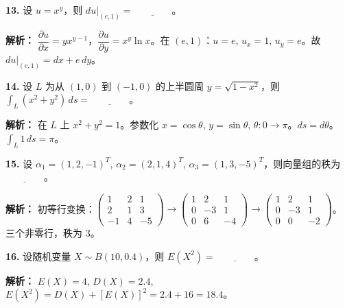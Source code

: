 \vspace{8pt}

\textbf{13.} 设 $u = x^y$，则 $du|_{(e,1)} = \underline{\qquad\qquad}$。

\ifshowsolutions\par\noindent\textbf{解析：} $\dfrac{\partial u}{\partial x} = y x^{y-1}$，$\dfrac{\partial u}{\partial y} = x^y\ln x$。在 $(e,1)$：$u=e$, $u_x=1$, $u_y=e$。故 $du|_{(e,1)} = dx + e\,dy$。
\else \answerarea \fi

\vspace{8pt}

\textbf{14.} 设 $L$ 为从 $(1,0)$ 到 $(-1,0)$ 的上半圆周 $y=\sqrt{1-x^2}$，则 $\displaystyle\int_{L} (x^2+y^2)\,ds = \underline{\qquad\qquad}$。

\ifshowsolutions\par\noindent\textbf{解析：} 在 $L$ 上 $x^2+y^2=1$。参数化 $x=\cos\theta$, $y=\sin\theta$, $\theta:0\to\pi$。$ds=d\theta$。$\int_{L}1\,ds=\pi$。
\else \answerarea \fi

\vspace{8pt}

\textbf{15.} 设 $\alpha_1=(1,2,-1)^T$, $\alpha_2=(2,1,4)^T$, $\alpha_3=(1,3,-5)^T$，则向量组的秩为 $\underline{\qquad\qquad}$。

\ifshowsolutions\par\noindent\textbf{解析：} 初等行变换：$\begin{pmatrix}1&2&1\\2&1&3\\-1&4&-5\end{pmatrix} \to \begin{pmatrix}1&2&1\\0&-3&1\\0&6&-4\end{pmatrix} \to \begin{pmatrix}1&2&1\\0&-3&1\\0&0&-2\end{pmatrix}$。三个非零行，秩为 $3$。
\else \answerarea \fi

\vspace{8pt}

\textbf{16.} 设随机变量 $X \sim B(10, 0.4)$，则 $E(X^2) = \underline{\qquad\qquad}$。

\ifshowsolutions\par\noindent\textbf{解析：} $E(X)=4$, $D(X)=2.4$, $E(X^2)=D(X)+[E(X)]^2=2.4+16=18.4$。
\else \answerarea \fi

